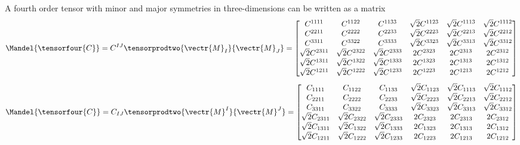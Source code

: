 A fourth order tensor with minor and major symmetries in
three-dimensions can be written as a matrix \ie
\begin{equation}
  \Mandel{\tensorfour{C}}=C^{IJ}\tensorprodtwo{\vectr{M}_{I}}{\vectr{M}_{J}}=\begin{bmatrix}
    C^{1111} & C^{1122} & C^{1133} & \sqrt{2}C^{1123} & \sqrt{2}C^{1113} & \sqrt{2}C^{1112} \\
    C^{2211} & C^{2222} & C^{2233} & \sqrt{2}C^{2223} & \sqrt{2}C^{2213} & \sqrt{2}C^{2212} \\
    C^{3311} & C^{3322} & C^{3333} & \sqrt{2}C^{3323} & \sqrt{2}C^{3313} & \sqrt{2}C^{3312} \\
    \sqrt{2}C^{2311} & \sqrt{2}C^{2322} & \sqrt{2}C^{2333} & 2C^{2323} & 2C^{2313} & 2C^{2312} \\
    \sqrt{2}C^{1311} & \sqrt{2}C^{1322} & \sqrt{2}C^{1333} & 2C^{1323} & 2C^{1313} & 2C^{1312} \\
    \sqrt{2}C^{1211} & \sqrt{2}C^{1222} & \sqrt{2}C^{1233} & 2C^{1223} & 2C^{1213} & 2C^{1212}     
  \end{bmatrix}
\end{equation}
\begin{equation}
  \Mandel{\tensorfour{C}}=C_{IJ}\tensorprodtwo{\vectr{M}^{I}}{\vectr{M}^{J}}=\begin{bmatrix}
    C_{1111} & C_{1122} & C_{1133} & \sqrt{2}C_{1123} & \sqrt{2}C_{1113} & \sqrt{2}C_{1112} \\
    C_{2211} & C_{2222} & C_{2233} & \sqrt{2}C_{2223} & \sqrt{2}C_{2213} & \sqrt{2}C_{2212} \\
    C_{3311} & C_{3322} & C_{3333} & \sqrt{2}C_{3323} & \sqrt{2}C_{3313} & \sqrt{2}C_{3312} \\
    \sqrt{2}C_{2311} & \sqrt{2}C_{2322} & \sqrt{2}C_{2333} & 2C_{2323} & 2C_{2313} & 2C_{2312} \\
    \sqrt{2}C_{1311} & \sqrt{2}C_{1322} & \sqrt{2}C_{1333} & 2C_{1323} & 2C_{1313} & 2C_{1312} \\
    \sqrt{2}C_{1211} & \sqrt{2}C_{1222} & \sqrt{2}C_{1233} & 2C_{1223} & 2C_{1213} & 2C_{1212}     
  \end{bmatrix}
\end{equation}
